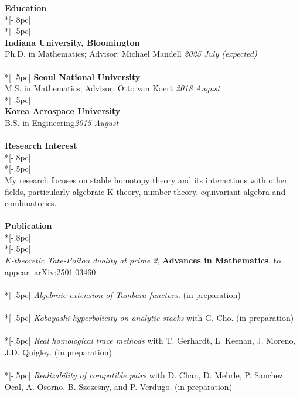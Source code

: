 \documentclass{article}
\begin{document}
{\Large \bf Education} \\*[-.8pc]
\underline{\hspace{6.5in}} \\*[-.5pc]
\\
{\bf Indiana University, Bloomington}\\ 
{Ph.D. in Mathematics; Advisor: Michael Mandell} \hfill {\it  2025 July (expected)} \\
\\*[-.5pc]
{\bf Seoul National University} \\ 
{M.S. in Mathematics; Advisor: Otto van Koert} \hfill{\it 2018 August} \\*[-.5pc]
\\
{\bf Korea Aerospace University} \\
{B.S. in Engineering}\hfill{\it 2015 August}\\
\\
{\Large \bf Research Interest} \\*[-.8pc]
\underline{\hspace{6.5in}} \\*[-.5pc]
\\
My research focuses on stable homotopy theory and its interactions with other fields, particularly algebraic K-theory, number theory, equivariant algebra and combinatorics.
\\
\\
{\Large \bf Publication} \\*[-.8pc]
\underline{\hspace{6.5in}} \\*[-.5pc]
\\
{\it K-theoretic Tate-Poitou duality at prime 2}, {\bf Advances in Mathematics}, to appear. \href{https://arxiv.org/abs/2501.03460}{arXiv:2501.03460}\\
\\*[-.5pc]
{\it Algebraic extension of Tambara functors}. (in preparation)\\
\\*[-.5pc]
{\it Kobayashi hyperbolicity on analytic stacks} with G. Cho. (in preparation)\\
\\*[-.5pc]
{\it Real homological trace methods} with T. Gerhardt, L. Keenan, J. Moreno, J.D. Quigley. (in preparation)\\
\\*[-.5pc]
{\it Realizability of compatible pairs} with D. Chan, D. Mehrle, P. Sanchez Ocal, A. Osorno, B. Szczesny, and P. Verdugo. (in preparation)\\
\end{document}

